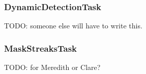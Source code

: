\subsubsection{DynamicDetectionTask}
\label{sec:DynamicDetectionTask}

TODO: someone else will have to write this.

\subsubsection{MaskStreaksTask}
\label{MaskStreaksTask}

TODO: for Meredith or Clare?
